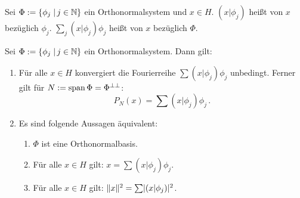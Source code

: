 \begin{defi}
  Sei $\Phi:=\{\phi_j\;\vert\, j\in \mathbb{N}\}$ ein Orthonormalsystem und $x\in H$. $(x\vert\phi_j)$ heißt  von $x$ bezüglich $\phi_j$. $\sum_j(x\vert\phi_j)\phi_j$ heißt  von $x$ bezüglich $\Phi$.
\end{defi}

\begin{theorem}
  \label{theorem:7.12} Sei $\Phi:=\{\phi_j\;\vert\, j\in\mathbb{N}\}$ ein Orthonormalsystem. Dann gilt:
  \begin{enumerate}[\rm(a)]
  \item \label{theorem:7.12-1} Für alle $x\in H$ konvergiert die Fourierreihe $\sum(x\vert \phi_j)\phi_j$ unbedingt. Ferner gilt für $N:=\operatorname{span}\Phi=\Phi^{\perp\perp}$:
    \[ P_N(x)=\sum(x\vert \phi_j)\phi_j\, . \]
  \item \label{theorem:7.12-2} Es sind folgende Aussagen äquivalent:
    \begin{enumerate}[\rm(i)]
    \item \label{theorem:7.12-2-1} $\Phi$ ist eine Orthonormalbasis.
    \item \label{theorem:7.12-2-2} Für alle $x\in H$ gilt: $x=\sum(x\vert \phi_j)\phi_j$.
    \item \label{theorem:7.12-2-3} Für alle $x\in H$ gilt: $\lVert x\rVert^2=\sum\lvert (x\vert\phi_j)\rvert^2$.
    \end{enumerate}
  \end{enumerate}
\end{theorem}

